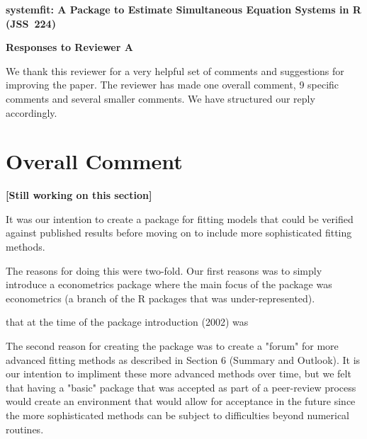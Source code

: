 \documentclass[12pt,english]{scrartcl}
\begin{document}
\begin{center}
{\Large\textbf{
systemfit: A Package to Estimate
Simultaneous Equation Systems in R (JSS~224)}}

\bigskip

{\Large\textbf{Responses to Reviewer A}}
\end{center}


We thank this reviewer for a very helpful set of comments and suggestions
for improving the paper.
The reviewer has made one overall comment, 9 specific comments and
several smaller comments.
We have structured our reply accordingly.

\section{Overall Comment}

\textbf{[Still working on this section]}

It was our intention to create a package for fitting models that could
be verified against published results before moving on to include more
sophisticated fitting methods.

The reasons for doing this were two-fold.
Our first reasons was to simply introduce a econometrics package where
the main focus of the package was econometrics (a branch of the R
packages that was under-represented).  

that at the time of the package introduction (2002) was

The second reason for creating the package was to create a "forum" for
more advanced fitting methods as described in Section 6 (Summary and
Outlook). It is our intention to impliment these more advanced methods
over time, but we felt that having a "basic" package that was accepted
as part of a peer-review process would create an environment that
would allow for acceptance in the future since the more sophisticated
methods can be subject to difficulties beyond numerical routines.
\end{document}
